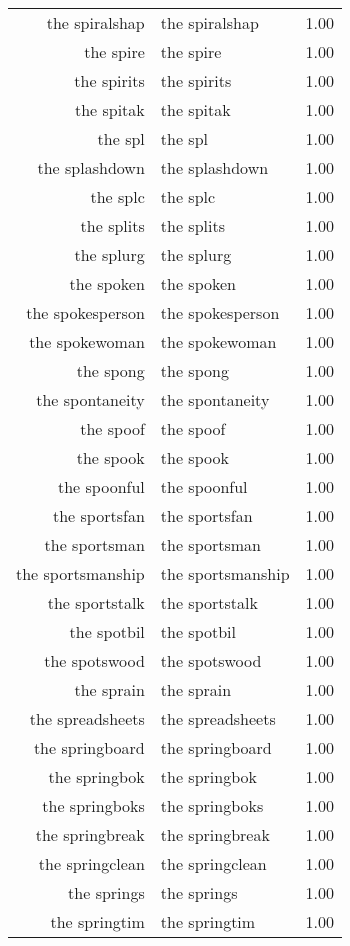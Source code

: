 \begin{table}[ht]
\begin{tabular}{rlr}
  the spiralshap & the spiralshap & 1.00 \\ 
  the spire & the spire & 1.00 \\ 
  the spirits & the spirits & 1.00 \\ 
  the spitak & the spitak & 1.00 \\ 
  the spl & the spl & 1.00 \\ 
  the splashdown & the splashdown & 1.00 \\ 
  the splc & the splc & 1.00 \\ 
  the splits & the splits & 1.00 \\ 
  the splurg & the splurg & 1.00 \\ 
  the spoken & the spoken & 1.00 \\ 
  the spokesperson & the spokesperson & 1.00 \\ 
  the spokewoman & the spokewoman & 1.00 \\ 
  the spong & the spong & 1.00 \\ 
  the spontaneity & the spontaneity & 1.00 \\ 
  the spoof & the spoof & 1.00 \\ 
  the spook & the spook & 1.00 \\ 
  the spoonful & the spoonful & 1.00 \\ 
  the sportsfan & the sportsfan & 1.00 \\ 
  the sportsman & the sportsman & 1.00 \\ 
  the sportsmanship & the sportsmanship & 1.00 \\ 
  the sportstalk & the sportstalk & 1.00 \\ 
  the spotbil & the spotbil & 1.00 \\ 
  the spotswood & the spotswood & 1.00 \\ 
  the sprain & the sprain & 1.00 \\ 
  the spreadsheets & the spreadsheets & 1.00 \\ 
  the springboard & the springboard & 1.00 \\ 
  the springbok & the springbok & 1.00 \\ 
  the springboks & the springboks & 1.00 \\ 
  the springbreak & the springbreak & 1.00 \\ 
  the springclean & the springclean & 1.00 \\ 
  the springs & the springs & 1.00 \\ 
  the springtim & the springtim & 1.00 \\ 

\end{tabular}
\end{table}
